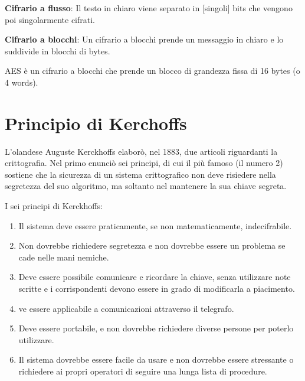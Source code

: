 \textsf{\small \textbf{Cifrario a flusso}: Il testo in chiaro viene separato in [singoli] bits che vengono poi singolarmente cifrati.} %

\textsf{\small \textbf{Cifrario a blocchi}: Un cifrario a blocchi prende un messaggio in chiaro e lo suddivide in blocchi di bytes.} %

\textsf{\small  AES è un cifrario a blocchi che prende un blocco di grandezza fissa di 16 bytes (o 4 words).}



\section{Principio di Kerchoffs}

\textsf{\small L'olandese Auguste Kerckhoffs elaborò, nel 1883, due articoli riguardanti la crittografia. Nel primo enunciò sei principi, di cui il più famoso (il numero 2) sostiene che la sicurezza di un sistema crittografico non deve risiedere nella segretezza del suo algoritmo, ma soltanto nel mantenere la sua chiave segreta.} %

\textsf{\small I sei principi di Kerckhoffs:} %


\begin{enumerate}
	\item \textsf{\small Il sistema deve essere praticamente, se non matematicamente, indecifrabile.} %
	\item \textsf{\small Non dovrebbe richiedere segretezza e non dovrebbe essere un problema se cade nelle mani nemiche.} %
	\item \textsf{\small Deve essere possibile comunicare e ricordare la chiave, senza utilizzare note scritte e i corrispondenti devono essere in grado di modificarla a piacimento.} %
	\item \textsf{\small ve essere applicabile a comunicazioni attraverso il telegrafo.} %
	\item \textsf{\small  Deve essere portabile, e non dovrebbe richiedere diverse persone per poterlo utilizzare.} %
	\item \textsf{\small Il sistema dovrebbe essere facile da usare e non dovrebbe essere stressante o richiedere ai propri operatori di seguire una lunga lista di procedure.} %
\end{enumerate}

